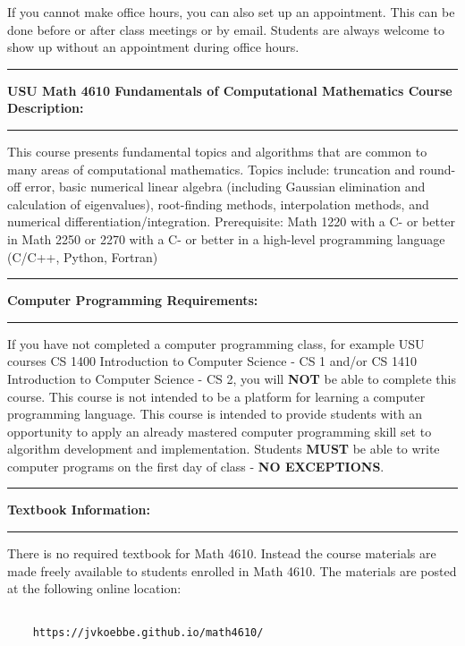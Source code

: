 \documentclass[10pt,fleqn]{article}
\begin{document}
If you cannot make office hours, you can also set up an appointment. This can be
done before or after class meetings or by email. 
Students are always welcome to show
up without an appointment during office hours.
\vskip0.1in\hrule\vskip0.1in
\noindent
{\bf USU Math 4610 Fundamentals of Computational Mathematics Course
     Description:}
\vskip0.1in\hrule\vskip0.1in
\noindent
This course presents fundamental topics and algorithms that are common to many
areas of computational mathematics. Topics include: truncation and round-off
error, basic numerical linear algebra (including Gaussian elimination and
calculation of eigenvalues), root-finding methods, interpolation methods, and
numerical differentiation/integration. Prerequisite: Math 1220 with a C- or
better in Math 2250 or 2270 with a C- or better in a high-level programming
language (C/C++, Python, Fortran) 
\vskip0.1in\hrule\vskip0.1in
\noindent
{\bf Computer Programming Requirements:}
\vskip0.1in\hrule\vskip0.1in
\noindent
If you have not completed a computer programming class, for example USU courses
CS 1400 Introduction to Computer Science - CS 1 and/or CS 1410 Introduction to
Computer Science - CS 2, you will {\bf NOT} be able to complete this course.
This course is not intended to be a platform for learning a computer programming
language. This course is intended to provide students with an opportunity to
apply an already mastered computer programming skill set to algorithm
development and implementation. Students {\bf MUST} be able to write computer
programs on the first day of class - {\bf NO EXCEPTIONS}.
\vskip0.1in\hrule\vskip0.1in
\noindent
{\bf Textbook Information:}
\vskip0.1in\hrule\vskip0.1in
\noindent
There is no required textbook for Math 4610. Instead the course materials are
made freely available to students enrolled in Math 4610. The materials are
posted at the following online location:
\begin{verbatim}

    https://jvkoebbe.github.io/math4610/
 
\end{verbatim}
\end{document}

